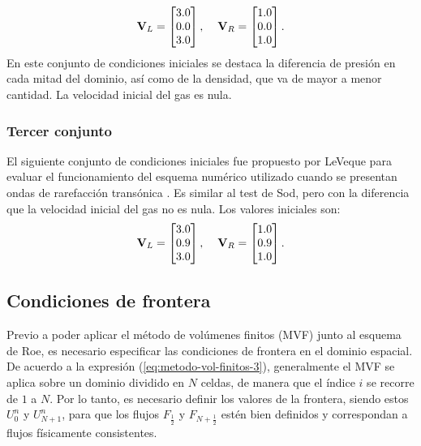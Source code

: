 \begin{equation}
\mathbf{V}_L = 
	\begin{bmatrix}
		3.0\\
		0.0\\
		3.0
	\end{bmatrix},\hspace{4mm}
\mathbf{V}_R = 
	\begin{bmatrix}
		1.0\\
		0.0\\
		1.0
	\end{bmatrix}.
\end{equation}
En este conjunto de condiciones iniciales se destaca la diferencia de presión en cada mitad del dominio, así como de la densidad, que va de mayor a menor cantidad. La velocidad inicial del gas es nula.

\subsubsection{Tercer conjunto}
\label{sec:leveque_sin_entropy714}
El siguiente conjunto de condiciones iniciales fue propuesto por LeVeque para evaluar el funcionamiento del esquema numérico utilizado cuando se presentan ondas de rarefacción transónica \cite{pelanti}. Es similar al test de Sod, pero con la diferencia que la velocidad inicial del gas no es nula. Los valores iniciales son:
\begin{equation}
	\mathbf{V}_L = 
	\begin{bmatrix}
		3.0\\
		0.9\\
		3.0
	\end{bmatrix},\hspace{4mm}
	\mathbf{V}_R = 
	\begin{bmatrix}
		1.0\\
		0.9\\
		1.0
	\end{bmatrix}.
\end{equation}
\subsection{Condiciones de frontera}
Previo a poder aplicar el método de volúmenes finitos (MVF) junto al esquema de Roe, es necesario especificar las condiciones de frontera en el dominio espacial.
De acuerdo a la expresión (\ref{eq:metodo-vol-finitos-3}), generalmente el MVF se aplica sobre un dominio dividido en $N$ celdas, de manera que el índice $i$ se recorre de $1$ a $N$. Por lo tanto, es necesario definir los valores de la frontera, siendo estos $U_{0}^{n}$ y $U_{N+1}^{n}$, para que los flujos $F_{\frac{1}{2}}$ y $F_{N+\frac{1}{2}}$ estén bien definidos y correspondan a flujos físicamente consistentes.
